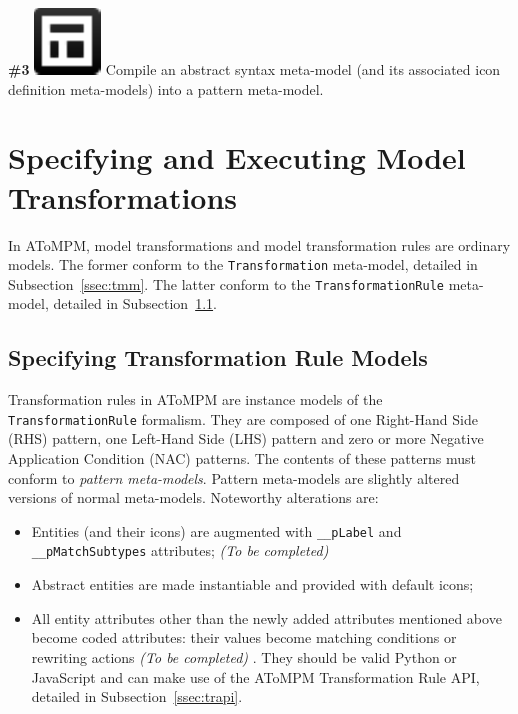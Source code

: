 \documentclass{article}
\numberwithin{equation}{section}
\numberwithin{figure}{section}
\newcommand{\TBC}{\textit{(To be completed) }}
\begin{document}
\textbf{\#3} \hspace*{1cm}
\includegraphics[scale=0.5]{figures/icon_compileToPatternMM} \hspace*{1cm}
Compile an abstract syntax meta-model (and its associated icon definition meta-\hspace*{3.7cm}models) into a pattern meta-model.





\newpage
\section{Specifying and Executing Model Transformations}
\label{sec:mt}
In AToMPM, model transformations and model transformation rules are ordinary models. The former conform to the \texttt{Transformation} meta-model, detailed in Subsection~\ref{ssec:tmm}. The latter conform to the \texttt{TransformationRule} meta-model, detailed in Subsection~\ref{ssec:trmm}.



\subsection{Specifying Transformation Rule Models}
\label{ssec:trmm}
Transformation rules in AToMPM are instance models of the \texttt{TransformationRule} formalism. They are composed of one Right-Hand Side (RHS) pattern, one Left-Hand Side (LHS) pattern and zero or more Negative Application Condition (NAC) patterns. The contents of these patterns must conform to \textit{pattern meta-models}. Pattern meta-models are slightly altered versions of normal meta-models. Noteworthy alterations are:
\begin{itemize}
	\item Entities (and their icons) are augmented with \texttt{\_\_pLabel} and \texttt{\_\_pMatchSubtypes} attributes; \TBC
	\item Abstract entities are made instantiable and provided with default icons;
	\item All entity attributes other than the newly added attributes mentioned above become coded attributes: their values become matching conditions or rewriting actions \TBC. They should be valid Python or JavaScript and can make use of the AToMPM Transformation Rule API, detailed in  Subsection~\ref{ssec:trapi}.	
\end{itemize}
\end{document}
